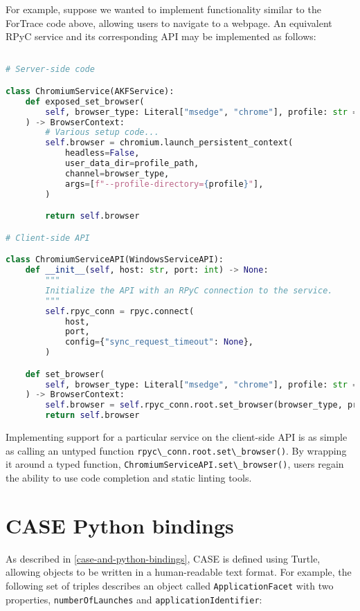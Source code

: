 \documentclass[letterpaper,12pt]{report}
\newcommand{\passthrough}[1]{#1}
\begin{document}
For example, suppose we wanted to implement functionality similar to the
ForTrace code above, allowing users to navigate to a webpage. An
equivalent RPyC service and its corresponding API may be implemented as
follows:

\begin{lstlisting}[language=Python]

# Server-side code

class ChromiumService(AKFService):
    def exposed_set_browser(
        self, browser_type: Literal["msedge", "chrome"], profile: str = "Default"
    ) -> BrowserContext:
        # Various setup code...
        self.browser = chromium.launch_persistent_context(
            headless=False,
            user_data_dir=profile_path,
            channel=browser_type,
            args=[f"--profile-directory={profile}"],
        )

        return self.browser

# Client-side API

class ChromiumServiceAPI(WindowsServiceAPI):
    def __init__(self, host: str, port: int) -> None:
        """
        Initialize the API with an RPyC connection to the service.
        """
        self.rpyc_conn = rpyc.connect(
            host,
            port,
            config={"sync_request_timeout": None},
        )

    def set_browser(
        self, browser_type: Literal["msedge", "chrome"], profile: str = "Default"
    ) -> BrowserContext:
        self.browser = self.rpyc_conn.root.set_browser(browser_type, profile)
        return self.browser
\end{lstlisting}

Implementing support for a particular service on the client-side API is
as simple as calling an untyped function
\passthrough{\lstinline!rpyc\_conn.root.set\_browser()!}. By wrapping it
around a typed function,
\passthrough{\lstinline!ChromiumServiceAPI.set\_browser()!}, users
regain the ability to use code completion and static linting tools.

\section{CASE Python bindings}\label{case-python-bindings}

As described in \autoref{case-and-python-bindings}, CASE is defined using Turtle, allowing objects to be
written in a human-readable text format. For example, the following set
of triples describes an object called
\passthrough{\lstinline!ApplicationFacet!} with two properties,
\passthrough{\lstinline!numberOfLaunches!} and
\passthrough{\lstinline!applicationIdentifier!}:
\end{document}
